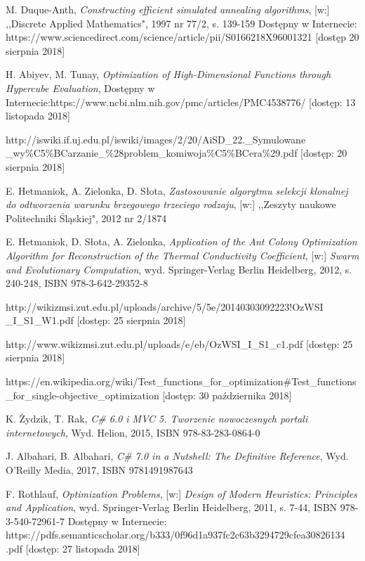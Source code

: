 \documentclass[twoside]{projektInzynierskiMS1}
\begin{document}
\begin{thebibliography}{12}

 M. Duque-Anth, \textit{Constructing efficient simulated annealing algorithms}, [w:] ,,Discrete Applied Mathematics", 1997 nr 77/2, s. 139-159 Dostępny w Internecie: https://www.sciencedirect.com/science/article/pii/S0166218X96001321
[dostęp 20 sierpnia 2018]

 H. Abiyev, M. Tunay, \textit{Optimization of High-Dimensional Functions through Hypercube Evaluation}, Dostępny w Internecie:https://www.ncbi.nlm.nih.gov/pmc/articles/PMC4538776/
[dostęp: 13 listopada 2018]

 http://iswiki.if.uj.edu.pl/iswiki/images/2/20/AiSD\_22.\_Symulowane \_wy\%C5\%BCarzanie\_\%28problem\_komiwoja\%C5\%BCera\%29.pdf [dostęp: 20 sierpnia 2018]

E. Hetmaniok, A. Zielonka, D. Słota, \textit{Zastosowanie algorytmu selekcji klonalnej do odtworzenia warunku brzegowego trzeciego rodzaju}, [w:] ,,Zeszyty naukowe Politechniki Śląskiej", 2012 nr 2/1874

 E. Hetmaniok, D. Słota, A. Zielonka, \textit{Application of the Ant Colony Optimization Algorithm for Reconstruction of the Thermal Conductivity Coefficient}, [w:] \textit{Swarm and Evolutionary Computation}, wyd. Springer-Verlag Berlin Heidelberg, 2012,  s. 240-248, ISBN 978-3-642-29352-8

 http://wikizmsi.zut.edu.pl/uploads/archive/5/5e/20140303092223!OzWSI
\_I\_S1\_W1.pdf
[dostęp: 25 sierpnia 2018]

 http://www.wikizmsi.zut.edu.pl/uploads/e/eb/OzWSI\_I\_S1\_c1.pdf
[dostęp: 25 sierpnia 2018]

 https://en.wikipedia.org/wiki/Test\_functions\_for\_optimization\#Test\_functions
\_for\_single-objective\_optimization [dostęp: 30 października 2018]


 K. Żydzik, T. Rak,  \textit{C\# 6.0 i MVC 5. Tworzenie nowoczesnych portali internetowych}, Wyd. Helion, 2015, ISBN 
978-83-283-0864-0

 J. Albahari, B. Albahari, \textit{C\# 7.0 in a Nutshell: The Definitive Reference}, Wyd. O'Reilly Media, 2017, ISBN 9781491987643

 F. Rothlauf, \textit{Optimization Problems}, [w:] \textit{Design of Modern Heuristics: Principles and Application}, wyd. Springer-Verlag Berlin Heidelberg, 2011, s. 7-44, ISBN 978-3-540-72961-7
Dostępny w Internecie: https://pdfs.semanticscholar.org/b333/0f96d1a937fc2c63b3294729cfea30826134
.pdf
[dostęp: 27 listopada 2018]


\end{thebibliography}
\end{document}
